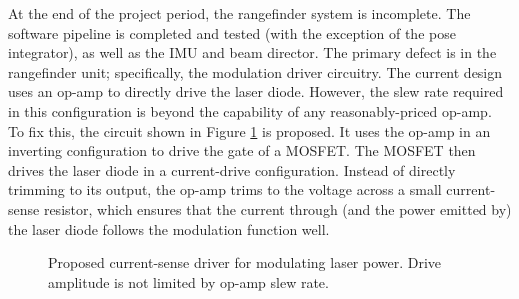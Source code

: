 \documentclass[twocolumn]{article}
\begin{document}
At the end of the project period, the rangefinder system is incomplete.  The
software pipeline is completed and tested (with the exception of the pose
integrator), as well as the IMU and beam director.  The primary defect is in the
rangefinder unit; specifically, the modulation driver circuitry.  The current
design uses an op-amp to directly drive the laser diode.  However, the slew rate
required in this configuration is beyond the capability of any reasonably-priced
op-amp.  To fix this, the circuit shown in Figure \ref{fig:current-sense-driver}
is proposed.  It uses the op-amp in an inverting configuration to drive the gate
of a MOSFET.  The MOSFET then drives the laser diode in a current-drive
configuration.  Instead of directly trimming to its output, the op-amp trims to
the voltage across a small current-sense resistor, which ensures that the
current through (and the power emitted by) the laser diode follows the
modulation function well.

\begin{figure}[h]
  \centering
  
  \caption{Proposed current-sense driver for modulating laser power.  Drive
    amplitude is not limited by op-amp slew rate.}
  \label{fig:current-sense-driver}
\end{figure}
\end{document}
